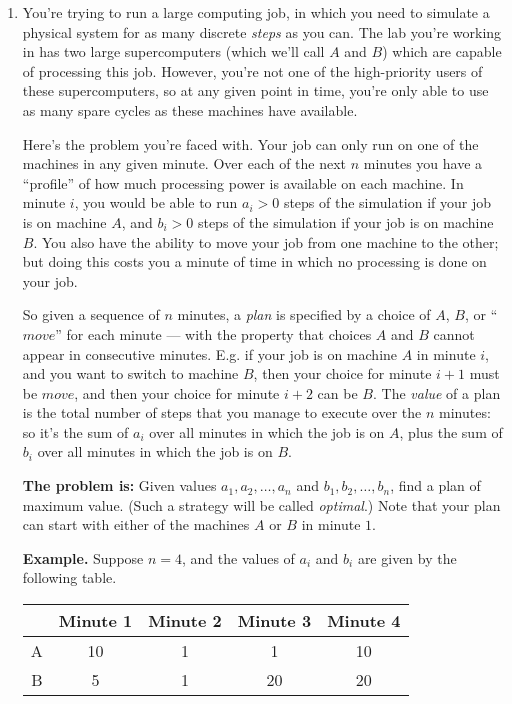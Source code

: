 \documentclass[12pt]{article}
\begin{document}
\begin{enumerate}

\item

You're trying to run a large computing job, in which you
need to simulate a physical system for as many discrete
{\em steps} as you can.
The lab you're working in has two large supercomputers
(which we'll call $A$ and $B$) which are capable of
processing this job.
However, you're not one of the high-priority users of
these supercomputers, so at any given point in time,
you're only able to use as many spare cycles as these
machines have available.

Here's the problem you're faced with.
Your job can only run on one of the machines in any given minute.
Over each of the next $n$ minutes
you have a ``profile'' of how much processing power
is available on each machine.
In minute $i$, you would be able to run $a_i > 0 $ steps of
the simulation if your job is on machine $A$,
and $b_i > 0$ steps of the simulation if your job is on machine $B$.
You also have the ability to move your job from one machine
to the other; but doing this costs you a minute of time
in which no processing is done on your job.

So given a sequence of $n$ minutes, a {\em plan} is
specified by a choice of $A$, $B$, or ``$move$''
for each minute --- with the property that
choices $A$ and $B$ cannot appear in consecutive minutes.
E.g. if your job is on machine $A$ in minute $i$,
and you want to switch to machine $B$, then
your choice for minute $i+1$ must be $move$,
and then your choice for minute $i+2$ can be $B$.
The {\em value} of a plan is the total number of steps
that you manage to execute over the $n$ minutes:
so it's the sum of $a_i$ over all minutes in which the
job is on $A$, plus the sum of $b_i$ over all minutes
in which the job is on $B$.

\bigskip
\bigskip
{\bf The problem is:} Given values
$a_1, a_2, \ldots, a_n$ and $b_1, b_2, \ldots, b_n$,
find a plan of maximum value.
(Such a strategy will be called {\em optimal}.)
Note that your plan can start with either of the machines
$A$ or $B$ in minute $1$.

\bigskip
\bigskip
{\bf Example.}  Suppose $n = 4$, and the values of $a_i$ and $b_i$
are given by the following table.

\begin{table}[h]
\begin{center}
\begin{tabular}{|c||c|c|c|c|}
\hline & Minute 1 & Minute 2 & Minute 3 & Minute 4 \\ \hline
A & 10 & 1 & 1 & 10 \\ \hline
B & 5  & 1 & 20 & 20 \\ \hline
\end{tabular}
\end{center}
\end{table}


\end{enumerate}
\end{document}
